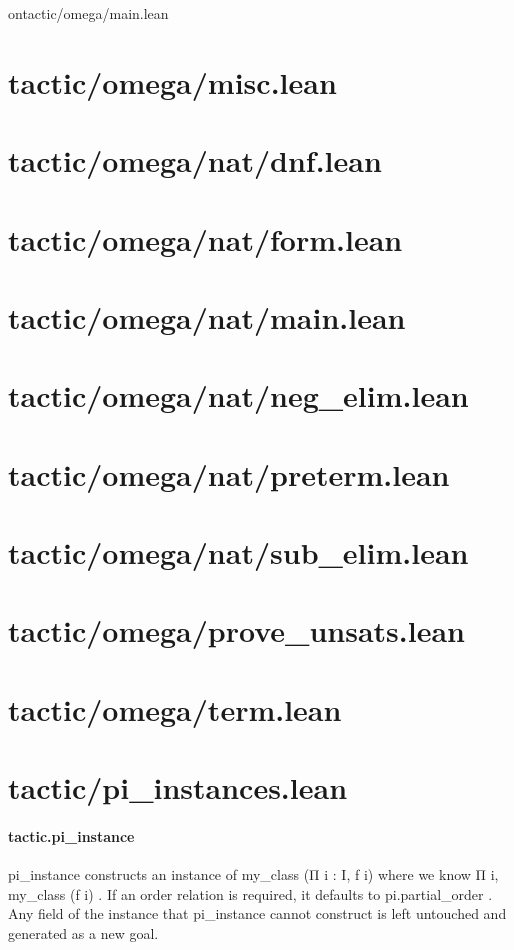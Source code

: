 \documentclass{article}
\begin{document}
on{tactic/omega/main.lean}\section{tactic/omega/misc.lean}\section{tactic/omega/nat/dnf.lean}\section{tactic/omega/nat/form.lean}\section{tactic/omega/nat/main.lean}\section{tactic/omega/nat/neg\_elim.lean}\section{tactic/omega/nat/preterm.lean}\section{tactic/omega/nat/sub\_elim.lean}\section{tactic/omega/prove\_unsats.lean}\section{tactic/omega/term.lean}\section{tactic/pi\_instances.lean}\paragraph{tactic.pi\_instance}
\par
\colorbox[RGB]{253,246,227}{{{{\color[RGB]{101, 123, 131} pi\_instance }}}} constructs an instance of 
\colorbox[RGB]{253,246,227}{{{{\color[RGB]{101, 123, 131} my\_class (Π i : I, f i) }}}}where we know 
\colorbox[RGB]{253,246,227}{{{{\color[RGB]{101, 123, 131} Π i, my\_class (f i) }}}}. If an order relation is required,
it defaults to 
\colorbox[RGB]{253,246,227}{{{{\color[RGB]{101, 123, 131} pi.partial\_order }}}}. Any field of the instance that
\colorbox[RGB]{253,246,227}{{{{\color[RGB]{101, 123, 131} pi\_instance }}}} cannot construct is left untouched and generated as a new goal.
\end{document}
